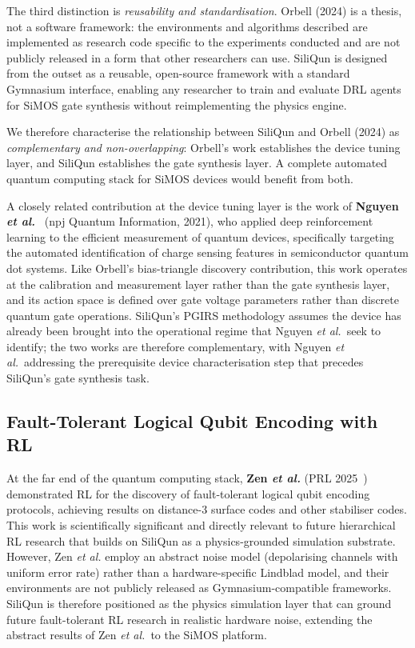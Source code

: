 The third distinction is \emph{reusability and standardisation}. Orbell
(2024) is a thesis, not a software framework: the environments and
algorithms described are implemented as research code specific to the
experiments conducted and are not publicly released in a form that other
researchers can use. SiliQun is designed from the outset as a reusable,
open-source framework with a standard Gymnasium interface, enabling any
researcher to train and evaluate DRL agents for SiMOS gate synthesis
without reimplementing the physics engine.

We therefore characterise the relationship between SiliQun and Orbell
(2024) as \emph{complementary and non-overlapping}: Orbell's work
establishes the device tuning layer, and SiliQun establishes the gate
synthesis layer. A complete automated quantum computing stack for SiMOS
devices would benefit from both.

A closely related contribution at the device tuning layer is the work of
\textbf{Nguyen \emph{et al.}}~\cite{Nguyen2021} (npj Quantum Information,
2021), who applied deep reinforcement learning to the efficient measurement
of quantum devices, specifically targeting the automated identification of
charge sensing features in semiconductor quantum dot systems. Like Orbell's
bias-triangle discovery contribution, this work operates at the
calibration and measurement layer rather than the gate synthesis layer, and
its action space is defined over gate voltage parameters rather than discrete
quantum gate operations. SiliQun's PGIRS methodology assumes the device has
already been brought into the operational regime that Nguyen \emph{et al.}\
seek to identify; the two works are therefore complementary, with Nguyen
\emph{et al.}\ addressing the prerequisite device characterisation step that
precedes SiliQun's gate synthesis task.

\subsection{Fault-Tolerant Logical Qubit Encoding with RL}
\label{sec:rw_fault_tolerant}

At the far end of the quantum computing stack, \textbf{Zen \emph{et al.}}
(PRL 2025~\cite{Zen2025}) demonstrated RL for the discovery of
fault-tolerant logical qubit encoding protocols, achieving results on
distance-3 surface codes and other stabiliser codes. This work is
scientifically significant and directly relevant to future hierarchical RL
research that builds on SiliQun as a physics-grounded simulation substrate.
However, Zen \emph{et al.}
employ an abstract noise model (depolarising channels with uniform error
rate) rather than a hardware-specific Lindblad model, and their
environments are not publicly released as Gymnasium-compatible frameworks.
SiliQun is therefore positioned as the physics simulation layer that can
ground future fault-tolerant RL research in realistic hardware noise,
extending the abstract results of Zen \emph{et al.}\ to the SiMOS platform.

